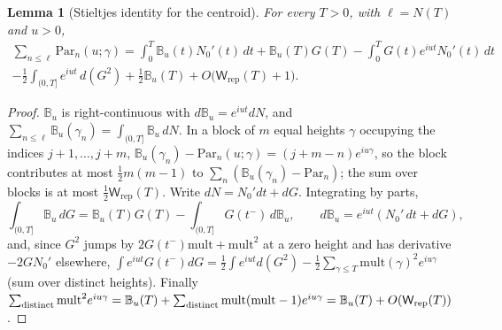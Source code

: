 \documentclass[11pt,a4paper]{article}
\numberwithin{equation}{section}
\newtheorem{lemma}[theorem]{Lemma}
\theoremstyle{definition}
\theoremstyle{remark}
\begin{document}
\begin{lemma}[Stieltjes identity for the centroid]\label{lem:v14-stielt}
For every $T>0$, with $\ell=N(T)$ and $u>0$,
\begin{multline}
\sum_{n\le\ell}\mathrm{Par}_n(u;\gamma)=\int_0^T\mathbb B_u(t)N_0'(t)\,dt+\mathbb B_u(T)G(T)-\int_0^TG(t)e^{iut}N_0'(t)\,dt\\
-\tfrac12\int_{(0,T]}e^{iut}\,d(G^2)+\tfrac12\mathbb B_u(T)+O\bigl(\mathsf W_{\mathrm{rep}}(T)+1\bigr).
\end{multline}
\end{lemma}
\begin{proof}
$\mathbb B_u$ is right-continuous with $d\mathbb B_u=e^{iut}dN$, and $\sum_{n\le\ell}\mathbb B_u(\gamma_n)=\int_{(0,T]}\mathbb B_u\,dN$. In a block of $m$ equal heights $\gamma$ occupying the indices $j+1,\dots,j+m$, $\mathbb B_u(\gamma_n)-\mathrm{Par}_n(u;\gamma)=(j+m-n)e^{iu\gamma}$, so the block contributes at most $\frac12m(m-1)$ to $\sum_n(\mathbb B_u(\gamma_n)-\mathrm{Par}_n)$; the sum over blocks is at most $\frac12\mathsf W_{\mathrm{rep}}(T)$. Write $dN=N_0'dt+dG$. Integrating by parts,
\begin{equation}
\int_{(0,T]}\mathbb B_u\,dG=\mathbb B_u(T)G(T)-\int_{(0,T]}G(t^-)\,d\mathbb B_u,\qquad d\mathbb B_u=e^{iut}(N_0'\,dt+dG),
\end{equation}
and, since $G^2$ jumps by $2G(t^-)\mathrm{mult}+\mathrm{mult}^2$ at a zero height and has derivative $-2GN_0'$ elsewhere, $\int e^{iut}G(t^-)dG=\frac12\int e^{iut}d(G^2)-\frac12\sum_{\gamma\le T}\mathrm{mult}(\gamma)^2e^{iu\gamma}$ (sum over distinct heights). Finally $\sum_{\rm distinct}\mathrm{mult}^2e^{iu\gamma}=\mathbb B_u(T)+\sum_{\rm distinct}\mathrm{mult}(\mathrm{mult}-1)e^{iu\gamma}=\mathbb B_u(T)+O(\mathsf W_{\mathrm{rep}}(T))$.
\end{proof}
\end{document}

